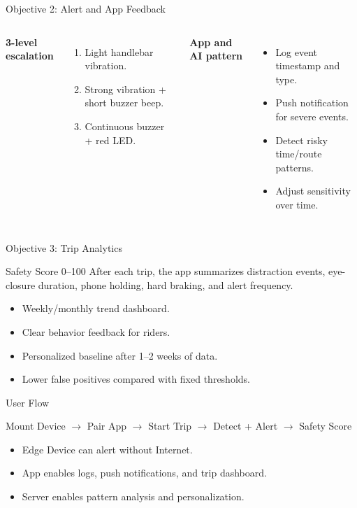 \documentclass[aspectratio=169]{beamer}
\begin{document}
\begin{frame}{Objective 2: Alert and App Feedback}
  \begin{columns}
    \textbf{3-level escalation}
    \begin{enumerate}
      \item Light handlebar vibration.
      \item Strong vibration + short buzzer beep.
      \item Continuous buzzer + red LED.
    \end{enumerate}
    \textbf{App and AI pattern}
    \begin{itemize}
      \item Log event timestamp and type.
      \item Push notification for severe events.
      \item Detect risky time/route patterns.
      \item Adjust sensitivity over time.
    \end{itemize}
  \end{columns}
\end{frame}

\begin{frame}{Objective 3: Trip Analytics}
  \begin{block}{Safety Score 0--100}
    After each trip, the app summarizes distraction events, eye-closure duration, phone holding, hard braking, and alert frequency.
  \end{block}
  \begin{itemize}
    \item Weekly/monthly trend dashboard.
    \item Clear behavior feedback for riders.
    \item Personalized baseline after 1--2 weeks of data.
    \item Lower false positives compared with fixed thresholds.
  \end{itemize}
\end{frame}

\begin{frame}{User Flow}
  \begin{center}
    \Large
    Mount Device $\rightarrow$ Pair App $\rightarrow$ Start Trip $\rightarrow$ Detect + Alert $\rightarrow$ Safety Score
  \end{center}
  \vspace{0.4cm}
  \begin{itemize}
    \item Edge Device can alert without Internet.
    \item App enables logs, push notifications, and trip dashboard.
    \item Server enables pattern analysis and personalization.
  \end{itemize}
\end{frame}
\end{document}
